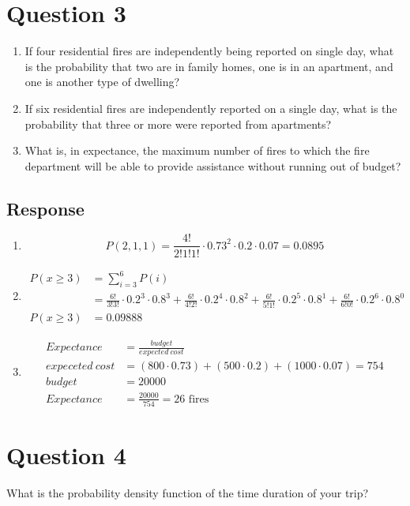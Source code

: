 \documentclass[13pt]{article}
\begin{document}
\newpage
\section*{Question 3}
\begin{enumerate}[label=(\alph*)]
\item If four residential fires are independently being reported on single day,
  what is the probability that two are in family homes, one is in an apartment,
  and one is another type of dwelling?
\item If six residential fires are independently reported on a single day, what is
  the probability that three or more were reported from apartments?
\item What is, in expectance, the maximum number of fires to which the fire department
  will be able to provide assistance without running out of budget?
\end{enumerate}

\subsection*{Response}
\begin{enumerate}[label=(\alph*)]
\item \[P(2, 1, 1) = \frac{4!}{2!1!1!} \cdot 0.73^2 \cdot 0.2 \cdot 0.07 = 0.0895\]
\item
  \begin{align*}
    P(x \geq 3) &= \sum_{i = 3}^{6} P(i) \\
    &= \frac{6!}{3!3!} \cdot 0.2^3 \cdot 0.8^3
      + \frac{6!}{4!2!} \cdot 0.2^4 \cdot 0.8^2
      + \frac{6!}{5!1!} \cdot 0.2^5 \cdot 0.8^1
      + \frac{6!}{6!0!} \cdot 0.2^6 \cdot 0.8^0 \\
    P(x \geq 3) &= 0.09888
  \end{align*}

\item
  \begin{align*}
    Expectance &= \frac{budget}{expected \ cost} \\
    expeceted \ cost &= (800 \cdot 0.73) + (500 \cdot 0.2) + (1000 \cdot 0.07) = 754 \\
    budget &= 20000 \\
    Expectance &= \frac{20000}{754} = 26 \text{ fires}
  \end{align*}
\end{enumerate}





\newpage
\section*{Question 4}
What is the probability density function of the time duration of your trip?
\end{document}
